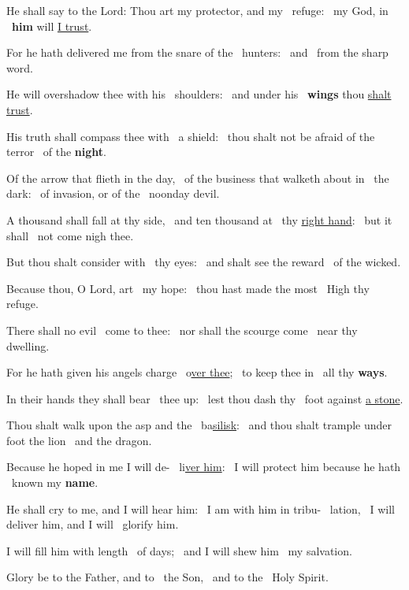 \documentclass[12pt]{article} %
\newenvironment{psalmtext}{\leftskip 0.25in}{\vspace{1 mm}}
\def\pipe{\textcolor{benred8}{\textdoublepipe}}
\let\oldgresixstar\gresixstar
\renewcommand{\gresixstar}{\textcolor{benred8}{\oldgresixstar}}
\let\oldgredagger\gredagger
\renewcommand{\gredagger}{\textcolor{benred8}{\oldgredagger}}
\begin{document}
\begin{pages}
\begin{Rightside}
\begin{psalmtext}
He shall say to the Lord: Thou art my protector, and my \pipe\ refuge: \gresixstar\ my God, in \pipe\ \textbf{him} will \uline{I trust}.

For he hath delivered me from the snare of the \pipe\ hunters: \gresixstar\ and \pipe\ from the sharp word.

He will overshadow thee with his \pipe\ shoulders: \gresixstar\ and under his \pipe\ \textbf{wings} thou \uline{shalt trust}.

His truth shall compass thee with \pipe\ a shield: \gresixstar\ thou shalt not be afraid of the terror \pipe\ of the \textbf{night}.

Of the arrow that flieth in the day, \gredagger\ of the business that walketh about in \pipe\ the dark: \gresixstar\ of invasion, or of the \pipe\ noonday devil.

A thousand shall fall at thy side, \gredagger\ and ten thousand at \pipe\ thy \uline{right hand}: \gresixstar\ but it shall \pipe\ not come nigh thee.

But thou shalt consider with \pipe\ thy eyes: \gresixstar\ and shalt see the reward \pipe\ of the wicked.

Because thou, O Lord, art \pipe\ my hope: \gresixstar\ thou hast made the most \pipe\ High thy refuge.

There shall no evil \pipe\ come to thee: \gresixstar\ nor shall the scourge come \pipe\ near thy dwelling.

For he hath given his angels charge \pipe\ o\uline{ver thee}; \gresixstar\ to keep thee in \pipe\ all thy \textbf{ways}.

In their hands they shall bear \pipe\ thee up: \gresixstar\ lest thou dash thy \pipe\ foot against \uline{a stone}.

Thou shalt walk upon the asp and the \pipe\ ba\uline{silisk}: \gresixstar\ and thou shalt trample under foot the lion \pipe\ and the dragon.

Because he hoped in me I will de- \pipe\ li\uline{ver him}: \gresixstar\ I will protect him because he hath \pipe\ known my \textbf{name}.

He shall cry to me, and I will hear him: \gredagger\ I am with him in tribu- \pipe\ lation, \gresixstar\ I will deliver him, and I will \pipe\ glorify him.

I will fill him with length \pipe\ of days; \gresixstar\ and I will shew him \pipe\ my salvation.

Glory be to the Father, and to \pipe\ the Son, \gresixstar\ and to the \pipe\ Holy Spirit.


\end{psalmtext}
\end{Rightside}
\end{pages}
\end{document}
